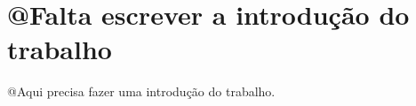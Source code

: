 
\section{@Falta escrever a introdução do trabalho}
@Aqui precisa fazer uma introdução do trabalho.
